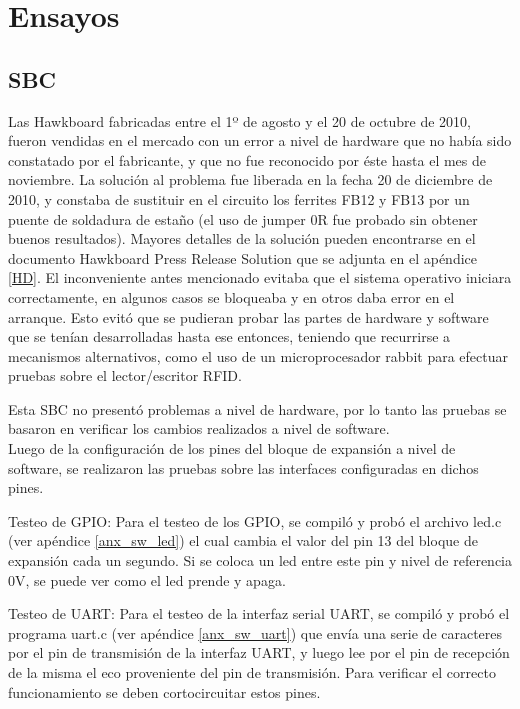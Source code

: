 \chapter{Ensayos}

\section{SBC}

Las Hawkboard fabricadas entre el 1º de agosto y el 20 de octubre de 2010, fueron vendidas en el mercado con un error a nivel de hardware que no había sido constatado por el fabricante, y que no fue reconocido por éste hasta el mes de noviembre. La solución al problema fue liberada en la fecha 20 de diciembre de 2010, y constaba de sustituir en el circuito los ferrites FB12 y FB13 por un puente de soldadura de estaño (el uso de jumper 0R fue probado sin obtener buenos resultados). Mayores detalles de la solución pueden encontrarse en el documento Hawkboard Press Release Solution que se adjunta en el apéndice \ref{HD}.
El inconveniente antes mencionado evitaba que el sistema operativo iniciara correctamente, en algunos casos se bloqueaba y en otros daba error en el arranque.
Esto evitó que se pudieran probar las partes de hardware y software que se tenían desarrolladas hasta ese entonces, teniendo que recurrirse a mecanismos alternativos, como el uso de un microprocesador rabbit para efectuar pruebas sobre el lector/escritor RFID.



\bigskip
{}
Esta SBC no presentó problemas a nivel de hardware, por lo tanto las pruebas se basaron en verificar los cambios realizados a nivel de software.\\
Luego de la configuración de los pines del bloque de expansión a nivel de software, se realizaron las pruebas sobre las interfaces configuradas en dichos pines.

\bigskip
{}

Testeo de GPIO: Para el testeo de los GPIO, se compiló y probó el archivo led.c (ver apéndice \ref{anx_sw_led}) el cual cambia el valor del pin 13 del bloque de expansión cada un segundo. Si se coloca un led entre este pin y nivel de referencia 0V, se puede ver como el led prende y apaga.

\bigskip
Testeo de UART: Para el testeo de la interfaz serial UART, se compiló y probó el programa uart.c
(ver apéndice \ref{anx_sw_uart}) que envía una serie de caracteres por el pin de transmisión de la interfaz UART, y luego lee por el pin de recepción de la misma el eco proveniente del pin de transmisión. Para verificar el correcto funcionamiento se deben cortocircuitar estos pines.

